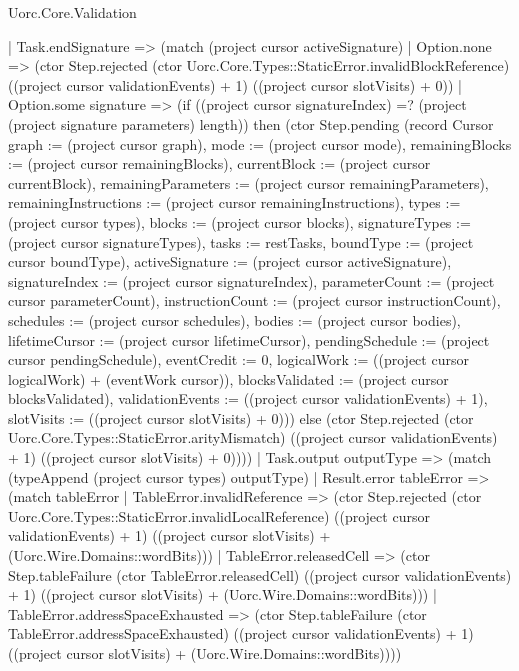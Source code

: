 \begin{lexlean}{Uorc.Core.Validation}
\begin{semanticmodule}
{      | Task.endSignature => (match (project cursor activeSignature)
        | Option.none => (ctor Step.rejected (ctor Uorc.Core.Types::StaticError.invalidBlockReference) ((project cursor validationEvents) + 1) ((project cursor slotVisits) + 0))
        | Option.some signature => (if ((project cursor signatureIndex) =? (project (project signature parameters) length)) then (ctor Step.pending (record Cursor {graph := (project cursor graph), mode := (project cursor mode), remainingBlocks := (project cursor remainingBlocks), currentBlock := (project cursor currentBlock), remainingParameters := (project cursor remainingParameters), remainingInstructions := (project cursor remainingInstructions), types := (project cursor types), blocks := (project cursor blocks), signatureTypes := (project cursor signatureTypes), tasks := restTasks, boundType := (project cursor boundType), activeSignature := (project cursor activeSignature), signatureIndex := (project cursor signatureIndex), parameterCount := (project cursor parameterCount), instructionCount := (project cursor instructionCount), schedules := (project cursor schedules), bodies := (project cursor bodies), lifetimeCursor := (project cursor lifetimeCursor), pendingSchedule := (project cursor pendingSchedule), eventCredit := 0, logicalWork := ((project cursor logicalWork) + (eventWork cursor)), blocksValidated := (project cursor blocksValidated), validationEvents := ((project cursor validationEvents) + 1), slotVisits := ((project cursor slotVisits) + 0)})) else (ctor Step.rejected (ctor Uorc.Core.Types::StaticError.arityMismatch) ((project cursor validationEvents) + 1) ((project cursor slotVisits) + 0))))
      | Task.output outputType => (match (typeAppend (project cursor types) outputType)
        | Result.error tableError => (match tableError
          | TableError.invalidReference => (ctor Step.rejected (ctor Uorc.Core.Types::StaticError.invalidLocalReference) ((project cursor validationEvents) + 1) ((project cursor slotVisits) + (Uorc.Wire.Domains::wordBits)))
          | TableError.releasedCell => (ctor Step.tableFailure (ctor TableError.releasedCell) ((project cursor validationEvents) + 1) ((project cursor slotVisits) + (Uorc.Wire.Domains::wordBits)))
          | TableError.addressSpaceExhausted => (ctor Step.tableFailure (ctor TableError.addressSpaceExhausted) ((project cursor validationEvents) + 1) ((project cursor slotVisits) + (Uorc.Wire.Domains::wordBits))))
}
\end{semanticmodule}
\end{lexlean}
